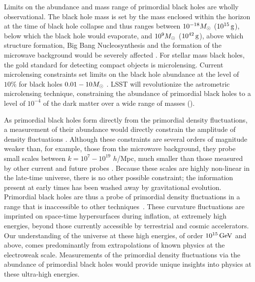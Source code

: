 Limits on the abundance and mass range of primordial black holes are wholly observational. The black hole mass is set by the mass enclosed within the horizon at the time of black hole collapse and thus ranges between $10^{-18} M_\odot$ ($10^{15}\mathrm{\,g}$), below which the black hole would evaporate, and $10^9 M_\odot$ ($10^{42}\mathrm{\,g}$), above which structure formation, Big Bang Nucleosynthesis and the formation of the microwave background would be severely affected \citep{Sasaki:2018}. 
For stellar mass black holes, the gold standard for detecting compact objects is microlensing. Current microlensing constraints set limits on the black hole abundance at the level of $10\%$ for black holes $0.01 - 10 M_\odot$ \citep[however, see][]{Calcino:2018}. LSST will revolutionize the astrometric microlensing technique,  constraining the abundance of primordial black holes to a level of $10^{-4}$ of the dark matter over a wide range of masses ().

As primordial black holes form directly from the primordial density fluctuations, a measurement of their abundance would directly constrain the amplitude of density fluctuations \citep{Carr:1974nx, Meszaros:1974}. %
Although these constraints are several orders of magnitude weaker than, for example, those from the microwave background, they probe small scales between $k = 10^{7} - 10^{19}$ $h$/Mpc, much smaller than those measured by other current and future probes \citep{Bringmann:2012}. Because these scales are highly non-linear in the late-time universe, there is no other possible constraint; the information present at early times has been washed away by gravitational evolution. Primordial black holes are thus a probe of primordial density fluctuations in a range that is inaccessible to other techniques~\citep{Josan:2009,Bellido:2017,Bellido:2018}. These curvature fluctuations are imprinted on space-time hypersurfaces during inflation, at extremely high energies, beyond those currently accessible by terrestrial and cosmic accelerators. 
Our understanding of the universe at these high energies, of order $10^{15} \mathrm{\,GeV}$ and above, comes predominantly from extrapolations of known physics at the electroweak scale.
Measurements of the primordial density fluctuations via the abundance of primordial black holes would provide unique insights into physics at these ultra-high energies.



